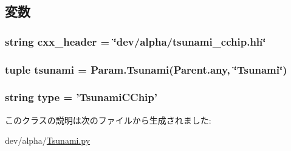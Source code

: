 \subsection{変数}
\hypertarget{classTsunami_1_1TsunamiCChip_a17da7064bc5c518791f0c891eff05fda}{
\subsubsection[{cxx\_\-header}]{\setlength{\rightskip}{0pt plus 5cm}string {\bf cxx\_\-header} = \char`\"{}dev/alpha/tsunami\_\-cchip.hh\char`\"{}}}
\label{classTsunami_1_1TsunamiCChip_a17da7064bc5c518791f0c891eff05fda}
\hypertarget{classTsunami_1_1TsunamiCChip_aabfaa1eda1546a625690c7a59b7fed04}{
\subsubsection[{tsunami}]{\setlength{\rightskip}{0pt plus 5cm}tuple {\bf tsunami} = Param.Tsunami(Parent.any, \char`\"{}Tsunami\char`\"{})}}
\label{classTsunami_1_1TsunamiCChip_aabfaa1eda1546a625690c7a59b7fed04}
\hypertarget{classTsunami_1_1TsunamiCChip_acce15679d830831b0bbe8ebc2a60b2ca}{
\subsubsection[{type}]{\setlength{\rightskip}{0pt plus 5cm}string {\bf type} = '{\bf TsunamiCChip}'}}
\label{classTsunami_1_1TsunamiCChip_acce15679d830831b0bbe8ebc2a60b2ca}


このクラスの説明は次のファイルから生成されました:\begin{DoxyCompactItemize}
\item 
dev/alpha/\hyperlink{Tsunami_8py}{Tsunami.py}\end{DoxyCompactItemize}
